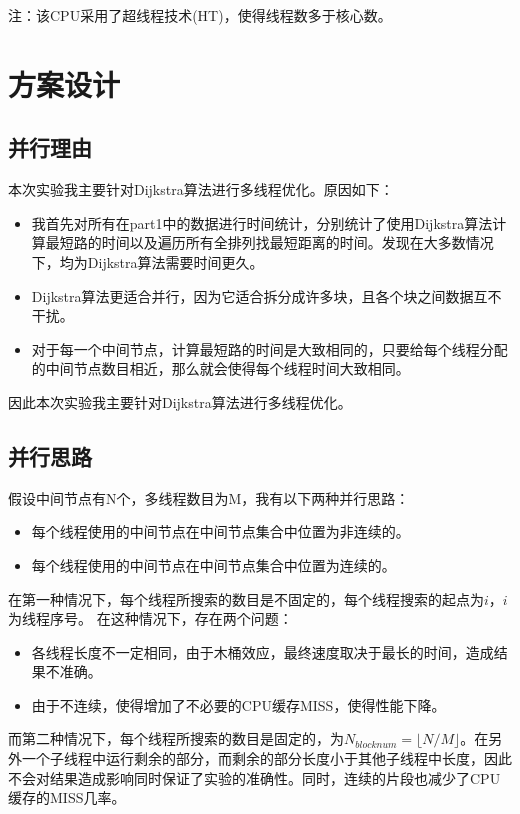 \documentclass[UTF8]{ctexart}
\begin{document}
注：该CPU采用了超线程技术(HT)，使得线程数多于核心数。

\section{方案设计}
\subsection{并行理由}
本次实验我主要针对Dijkstra算法进行多线程优化。原因如下：
\begin{itemize}
    \item 我首先对所有在part1中的数据进行时间统计，分别统计了使用Dijkstra算法计算最短路的时间以及遍历所有全排列找最短距离的时间。发现在大多数情况下，均为Dijkstra算法需要时间更久。
    \item Dijkstra算法更适合并行，因为它适合拆分成许多块，且各个块之间数据互不干扰。
    \item 对于每一个中间节点，计算最短路的时间是大致相同的，只要给每个线程分配的中间节点数目相近，那么就会使得每个线程时间大致相同。
\end{itemize}

因此本次实验我主要针对Dijkstra算法进行多线程优化。

\subsection{并行思路}
假设中间节点有N个，多线程数目为M，我有以下两种并行思路：
\begin{itemize}
    \item 每个线程使用的中间节点在中间节点集合中位置为非连续的。
    \item 每个线程使用的中间节点在中间节点集合中位置为连续的。
\end{itemize}

在第一种情况下，每个线程所搜索的数目是不固定的，每个线程搜索的起点为$i$，$i$为线程序号。
在这种情况下，存在两个问题：
\begin{itemize}
    \item 各线程长度不一定相同，由于木桶效应，最终速度取决于最长的时间，造成结果不准确。
    \item 由于不连续，使得增加了不必要的CPU缓存MISS，使得性能下降。
\end{itemize}

而第二种情况下，每个线程所搜索的数目是固定的，为$N_{blocknum}=\lfloor N/M \rfloor$。在另外一个子线程中运行剩余的部分，而剩余的部分长度小于其他子线程中长度，因此不会对结果造成影响同时保证了实验的准确性。同时，连续的片段也减少了CPU缓存的MISS几率。
\end{document}
